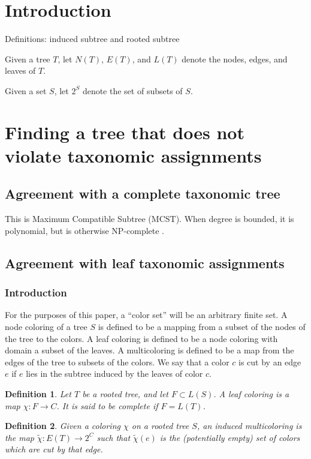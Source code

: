 \documentclass{amsart}
\newcommand{\col}{\chi}
\newcommand{\colt}{\tilde{\chi}}
\newtheorem{defn}{Definition}
\begin{document}
\section{Introduction}

Definitions: induced subtree and rooted subtree

Given a tree $T$, let $N(T)$, $E(T)$, and $L(T)$ denote the nodes, edges, and leaves of $T$.

Given a set $S$, let $2^S$ denote the set of subsets of $S$.

\section{Finding a tree that does not violate taxonomic assignments}

\subsection{Agreement with a complete taxonomic tree}
This is Maximum Compatible Subtree (MCST).
When degree is bounded, it is polynomial, but is otherwise NP-complete \cite{HeinEaComparingTrees96}.

\subsection{Agreement with leaf taxonomic assignments}

\subsubsection{Introduction}

For the purposes of this paper, a ``color set'' will be an arbitrary finite set.
A node coloring of a tree $S$ is defined to be a mapping from a subset of the nodes of the tree to the colors.
A leaf coloring is defined to be a node coloring with domain a subset of the leaves.
A multicoloring is defined to be a map from the edges of the tree to subsets of the colors.
We say that a color $c$ is cut by an edge $e$ if $e$ lies in the subtree induced by the leaves of color $c$.

\begin{defn}
  Let $T$ be a rooted tree, and let $F \subset L(S)$.
  A leaf coloring is a map $\col: F \rightarrow C$.
  It is said to be complete if $F = L(T)$.
\end{defn}

\begin{defn}
  Given a coloring $\col$ on a rooted tree $S$, an induced multicoloring is the map $\colt: E(T) \rightarrow 2^C$
  such that $\colt(e)$ is the (potentially empty) set of colors which are cut by that edge.
\end{defn}
\end{document}
